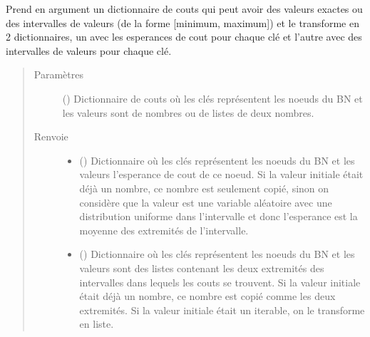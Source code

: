 \documentclass[letterpaper,10pt,french]{sphinxmanual}
\begin{document}
\begin{fulllineitems}
\begin{fulllineitems}
\end{fulllineitems}


\begin{fulllineitems}
\label{\detokenize{index:DecisionTheoreticTroubleshooting.TroubleShootingProblem._compute_costs}}
Prend en argument un dictionnaire de couts qui peut avoir des valeurs
exactes ou des intervalles de valeurs (de la forme {[}minimum, maximum{]})
et le transforme en 2 dictionnaires, un avec les esperances de cout
pour chaque clé et l’autre avec des intervalles de valeurs pour chaque
clé.
\begin{quote}\begin{description}
\item[{Paramètres}] \leavevmode
{} () \textendash{} Dictionnaire de couts où les clés représentent les noeuds
du BN et les valeurs sont de nombres ou de listes de deux
nombres.

\item[{Renvoie}] \leavevmode
\begin{itemize}
\item {} 
 () \textendash{} Dictionnaire où les clés représentent les noeuds du
BN et les valeurs l’esperance de cout de ce noeud. Si la valeur
initiale était déjà un nombre, ce nombre est seulement copié,
sinon on considère que la valeur est une variable aléatoire
avec une distribution uniforme dans l’intervalle et donc
l’esperance est la moyenne des extremités de l’intervalle.

\item {} 
 () \textendash{} Dictionnaire où les clés représentent les noeuds du
BN et les valeurs sont des listes contenant les deux extremités
des intervalles dans lequels les couts se trouvent. Si la
valeur initiale était déjà un nombre, ce nombre est copié comme
les deux extremités. Si la valeur initiale était un iterable,
on le transforme en liste.

\end{itemize}


\end{description}\end{quote}


\end{fulllineitems}
\end{fulllineitems}
\end{document}
